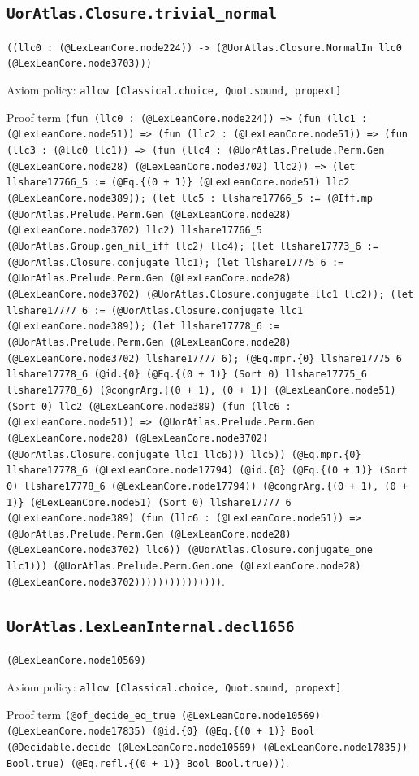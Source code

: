 \documentclass[11pt]{article}
\begin{document}
\subsection*{\texttt{UorAtlas.Closure.trivial\_normal}}
\noindent\texttt{((llc0 : (@LexLeanCore.node224)) -> (@UorAtlas.Closure.NormalIn llc0 (@LexLeanCore.node3703)))}\par
\noindent Axiom policy: \texttt{allow [Classical.choice, Quot.sound, propext]}.\par
\noindent Proof term \texttt{(fun (llc0 : (@LexLeanCore.node224)) => (fun (llc1 : (@LexLeanCore.node51)) => (fun (llc2 : (@LexLeanCore.node51)) => (fun (llc3 : (@llc0 llc1)) => (fun (llc4 : (@UorAtlas.Prelude.Perm.Gen (@LexLeanCore.node28) (@LexLeanCore.node3702) llc2)) => (let llshare17766\_5 := (@Eq.\{(0 + 1)\} (@LexLeanCore.node51) llc2 (@LexLeanCore.node389)); (let llc5 : llshare17766\_5 := (@Iff.mp (@UorAtlas.Prelude.Perm.Gen (@LexLeanCore.node28) (@LexLeanCore.node3702) llc2) llshare17766\_5 (@UorAtlas.Group.gen\_nil\_iff llc2) llc4); (let llshare17773\_6 := (@UorAtlas.Closure.conjugate llc1); (let llshare17775\_6 := (@UorAtlas.Prelude.Perm.Gen (@LexLeanCore.node28) (@LexLeanCore.node3702) (@UorAtlas.Closure.conjugate llc1 llc2)); (let llshare17777\_6 := (@UorAtlas.Closure.conjugate llc1 (@LexLeanCore.node389)); (let llshare17778\_6 := (@UorAtlas.Prelude.Perm.Gen (@LexLeanCore.node28) (@LexLeanCore.node3702) llshare17777\_6); (@Eq.mpr.\{0\} llshare17775\_6 llshare17778\_6 (@id.\{0\} (@Eq.\{(0 + 1)\} (Sort 0) llshare17775\_6 llshare17778\_6) (@congrArg.\{(0 + 1), (0 + 1)\} (@LexLeanCore.node51) (Sort 0) llc2 (@LexLeanCore.node389) (fun (llc6 : (@LexLeanCore.node51)) => (@UorAtlas.Prelude.Perm.Gen (@LexLeanCore.node28) (@LexLeanCore.node3702) (@UorAtlas.Closure.conjugate llc1 llc6))) llc5)) (@Eq.mpr.\{0\} llshare17778\_6 (@LexLeanCore.node17794) (@id.\{0\} (@Eq.\{(0 + 1)\} (Sort 0) llshare17778\_6 (@LexLeanCore.node17794)) (@congrArg.\{(0 + 1), (0 + 1)\} (@LexLeanCore.node51) (Sort 0) llshare17777\_6 (@LexLeanCore.node389) (fun (llc6 : (@LexLeanCore.node51)) => (@UorAtlas.Prelude.Perm.Gen (@LexLeanCore.node28) (@LexLeanCore.node3702) llc6)) (@UorAtlas.Closure.conjugate\_one llc1))) (@UorAtlas.Prelude.Perm.Gen.one (@LexLeanCore.node28) (@LexLeanCore.node3702)))))))))))))))}.\par
\subsection*{\texttt{UorAtlas.LexLeanInternal.decl1656}}
\noindent\texttt{(@LexLeanCore.node10569)}\par
\noindent Axiom policy: \texttt{allow [Classical.choice, Quot.sound, propext]}.\par
\noindent Proof term \texttt{(@of\_decide\_eq\_true (@LexLeanCore.node10569) (@LexLeanCore.node17835) (@id.\{0\} (@Eq.\{(0 + 1)\} Bool (@Decidable.decide (@LexLeanCore.node10569) (@LexLeanCore.node17835)) Bool.true) (@Eq.refl.\{(0 + 1)\} Bool Bool.true)))}.\par
\end{document}
